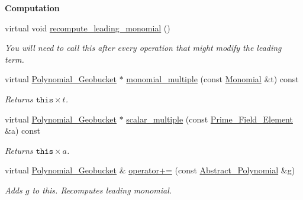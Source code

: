 \begin{Indent}\textbf{ Computation}\par
\begin{DoxyCompactItemize}
\item 
virtual void \hyperlink{class_polynomial___geobucket_ab57dbe8d5f0d3860997775d9f354ab0c}{recompute\+\_\+leading\+\_\+monomial} ()
\begin{DoxyCompactList}\small\item\em You will need to call this after every operation that might modify the leading term. \end{DoxyCompactList}\item 
\mbox{\label{class_polynomial___geobucket_aac5830eb1df80df31bc1c4a1d40e7e67}} 
virtual \hyperlink{class_polynomial___geobucket}{Polynomial\+\_\+\+Geobucket} $\ast$ \hyperlink{class_polynomial___geobucket_aac5830eb1df80df31bc1c4a1d40e7e67}{monomial\+\_\+multiple} (const \hyperlink{class_monomial}{Monomial} \&t) const
\begin{DoxyCompactList}\small\item\em Returns $\texttt{this}\times t$. \end{DoxyCompactList}\item 
\mbox{\label{class_polynomial___geobucket_a9609edf17bb9db8db50126e04505f21b}} 
virtual \hyperlink{class_polynomial___geobucket}{Polynomial\+\_\+\+Geobucket} $\ast$ \hyperlink{class_polynomial___geobucket_a9609edf17bb9db8db50126e04505f21b}{scalar\+\_\+multiple} (const \hyperlink{class_prime___field___element}{Prime\+\_\+\+Field\+\_\+\+Element} \&a) const
\begin{DoxyCompactList}\small\item\em Returns $\texttt{this}\times a$. \end{DoxyCompactList}\item 
\mbox{\label{class_polynomial___geobucket_a95da6da4035d8a4d50db0feb14d7efb9}} 
virtual \hyperlink{class_polynomial___geobucket}{Polynomial\+\_\+\+Geobucket} \& \hyperlink{class_polynomial___geobucket_a95da6da4035d8a4d50db0feb14d7efb9}{operator+=} (const \hyperlink{class_abstract___polynomial}{Abstract\+\_\+\+Polynomial} \&g)
\begin{DoxyCompactList}\small\item\em Adds $g$ to {\ttfamily this}. Recomputes leading monomial. \end{DoxyCompactList}\item 

\end{DoxyCompactItemize}
\end{Indent}
